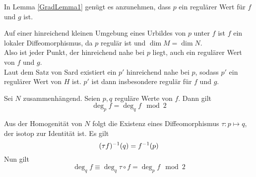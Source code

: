 \Lem{}
In Lemma \ref{GradLemma1} genügt es anzunehmen, dass $p$ ein regulärer Wert für $f$ und $g$ ist.
\begin{Beweis}{}
	Auf einer hinreichend kleinen Umgebung eines Urbildes von $p$ unter $f$ ist $f$ ein lokaler Diffeomorphismus, da $p$ regulär ist und $\dim M = \dim N$.\\
	Also ist jeder Punkt, der hinreichend nahe bei $p$ liegt, auch ein regulärer Wert von $f$ und $g$.\\
	Laut dem Satz von Sard existiert ein $p'$ hinreichend nahe bei $p$, sodass $p'$ ein regulärer Wert von $H$ ist. $p'$ ist dann insbesondere regulär für $f$ und $g$.
\end{Beweis}

\Lem{}
Sei $N$ zusammenhängend. Seien $p,q$ reguläre Werte von $f$. Dann gilt
\[ \deg_pf = \deg_qf \mod 2  \]
\begin{Beweis}{}
	Aus der Homogenität von $N$ folgt die Existenz eines Diffeomorphismus $\tau : p \mapsto q$, der isotop zur Identität ist. Es gilt
	\[ (\tau f)^{-1}(q) = f^{-1}(p) \]
	Nun gilt
	\[ \deg_q f \equiv \deg_q \tau \circ f = \deg_p f \mod 2 \]
\end{Beweis}